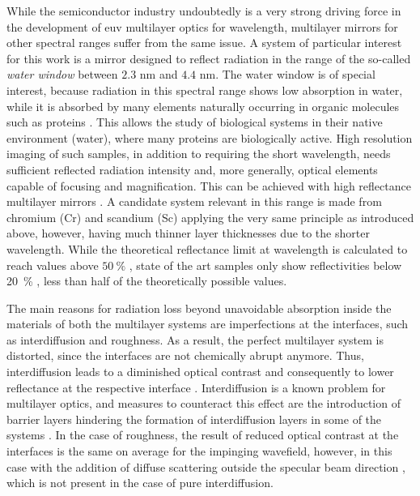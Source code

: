 While the semiconductor industry undoubtedly is a very strong driving force in the development of \gls{euv} multilayer optics for  wavelength,  multilayer mirrors for other spectral ranges suffer from the same issue. A system of particular interest for this work is a mirror designed to reflect radiation in the range of the so-called \emph{water window} between $2.3$ nm and $4.4$ nm. The water window is of special interest, because radiation in this spectral range shows low absorption in water, while it is absorbed by many elements naturally occurring in organic molecules such as proteins \cite{kirz_soft_1995}. This allows the study of biological systems in their native environment (water), where many proteins are biologically active. High resolution imaging of such samples, in addition to requiring the short wavelength, needs sufficient reflected radiation intensity and, more generally, optical elements capable of focusing and magnification. This can be achieved with high reflectance multilayer mirrors \cite{hertz_normal-incidence_1999,legall_compact_2012}. A candidate system relevant in this range is made from chromium (Cr) and scandium (Sc) applying the very same principle as introduced above, however, having much thinner layer thicknesses due to the shorter wavelength. While the theoretical reflectance limit at  wavelength is calculated to reach values above $\SI{50}{\percent}$ \cite{schafers_cr/sc_1998}, state of the art samples only show reflectivities below \SI{20}{\percent} \cite{eriksson_14.5_2003, yulin_high-performance_2004}, less than half of the theoretically possible values.

The main reasons for radiation loss beyond unavoidable absorption inside the materials of both the multilayer systems are imperfections at the interfaces, such as interdiffusion and roughness. As a result, the perfect multilayer system is distorted, since the interfaces are not chemically abrupt anymore. Thus, interdiffusion leads to a diminished optical contrast and consequently to lower reflectance at the respective interface \cite{nakajima_interdiffusion_1988}. Interdiffusion is a known problem for multilayer optics, and measures to counteract this effect are the introduction of barrier layers hindering the formation of interdiffusion layers in some of the systems \cite{braun_grenzflachen-optimierte_2003,braun_mo/si_2002}. In the case of roughness, the result of reduced optical contrast at the interfaces is the same on average for the impinging wavefield, however, in this case with the addition of diffuse scattering outside the specular beam direction \cite{sinha_x-ray_1994}, which is not present in the case of pure interdiffusion.

